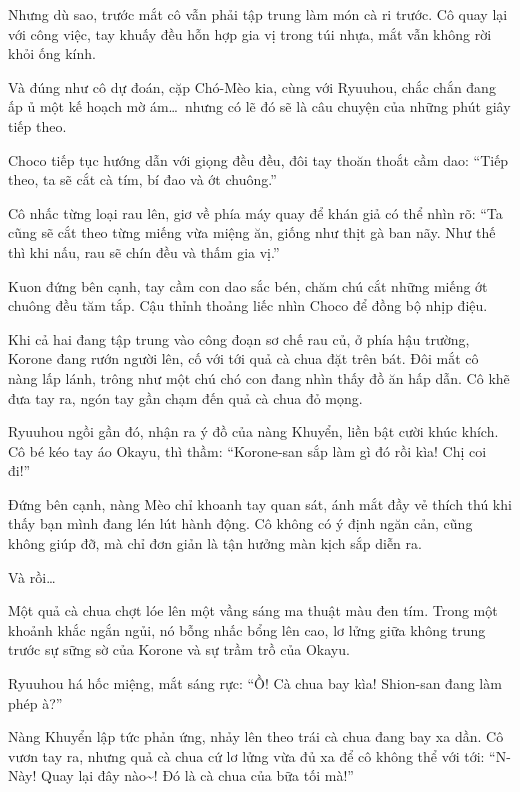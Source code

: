 \documentclass[../main.tex]{subfiles}
\begin{document}
Nhưng dù sao, trước mắt cô vẫn phải tập trung làm món cà ri trước. Cô quay lại với công việc, tay khuấy đều hỗn hợp gia vị trong túi nhựa, mắt vẫn không rời khỏi ống kính.

Và đúng như cô dự đoán, cặp Chó-Mèo kia, cùng với Ryuuhou, chắc chắn đang ấp ủ một kế hoạch mờ ám\dots\ nhưng có lẽ đó sẽ là câu chuyện của những phút giây tiếp theo.


\ct

Choco tiếp tục hướng dẫn với giọng đều đều, đôi tay thoăn thoắt cầm dao: ``Tiếp theo, ta sẽ cắt cà tím, bí đao và ớt chuông.''

Cô nhấc từng loại rau lên, giơ về phía máy quay để khán giả có thể nhìn rõ: ``Ta cũng sẽ cắt theo từng miếng vừa miệng ăn, giống như thịt gà ban nãy. Như thế thì khi nấu, rau sẽ chín đều và thấm gia vị.''

Kuon đứng bên cạnh, tay cầm con dao sắc bén, chăm chú cắt những miếng ớt chuông đều tăm tắp. Cậu thỉnh thoảng liếc nhìn Choco để đồng bộ nhịp điệu.

Khi cả hai đang tập trung vào công đoạn sơ chế rau củ, ở phía hậu trường, Korone đang rướn người lên, cố với tới quả cà chua đặt trên bát. Đôi mắt cô nàng lấp lánh, trông như một chú chó con đang nhìn thấy đồ ăn hấp dẫn. Cô khẽ đưa tay ra, ngón tay gần chạm đến quả cà chua đỏ mọng.

Ryuuhou ngồi gần đó, nhận ra ý đồ của nàng Khuyển, liền bật cười khúc khích. Cô bé kéo tay áo Okayu, thì thầm: ``Korone-san sắp làm gì đó rồi kìa! Chị coi đi!''

Đứng bên cạnh, nàng Mèo chỉ khoanh tay quan sát, ánh mắt đầy vẻ thích thú khi thấy bạn mình đang lén lút hành động. Cô không có ý định ngăn cản, cũng không giúp đỡ, mà chỉ đơn giản là tận hưởng màn kịch sắp diễn ra.

Và rồi\dots


Một quả cà chua chợt lóe lên một vầng sáng ma thuật màu đen tím. Trong một khoảnh khắc ngắn ngủi, nó bỗng nhấc bổng lên cao, lơ lửng giữa không trung trước sự sững sờ của Korone và sự trầm trồ của Okayu.

Ryuuhou há hốc miệng, mắt sáng rực: ``Ồ! Cà chua bay kìa! Shion-san đang làm phép à?''

Nàng Khuyển lập tức phản ứng, nhảy lên theo trái cà chua đang bay xa dần. Cô vươn tay ra, nhưng quả cà chua cứ lơ lửng vừa đủ xa để cô không thể với tới: ``N-Này! Quay lại đây nào\~{}! Đó là cà chua của bữa tối mà!''
\end{document}
